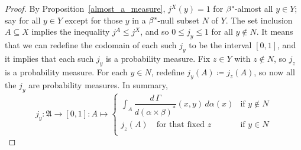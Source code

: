 \documentclass[
twoside=true,
paper=letter,
fontsize=9pt,
pagesize=auto,
leqno,
openany,
headsepline,
overfullrule,
]{scrbook}
\theoremstyle{plain}
\theoremstyle{plain}
\theoremstyle{definition}
\theoremstyle{bfnoteitalic}
\theoremstyle{bfnoteroman}
\newcommand{\sigalg}[1]{\mathfrak{#1}}
\newcommand{\definedby}{\coloneqq}
\newcommand{\sigmaalgebra}{\sigalg{A}}
\newcommand{\kernast}{\ast\kern-1pt}
\newcommand{\funcj}{j}
\newcommand{\measurespace}{X}
\newcommand{\measurespaceii}{Y}
\newcommand{\mspaceelt}{x}
\newcommand{\mspaceeltii}{y}
\newcommand{\mspaceeltiii}{z}
\newcommand{\seti}{A}
\newcommand{\measonprod}{\Gamma}%
\newcommand{\marginalone}{\alpha}%
\newcommand{\marginaltwo}{\beta}%
\begin{document}
\begin{proof}
By Proposition~\ref{almost_a_measure},
$j^\measurespace(\mspaceeltii) = 1$
for $\marginaltwo^\kernast$\hyp{}almost all  $\mspaceeltii\in\measurespaceii$; say for all
$\mspaceeltii\in\measurespaceii$ except for  those
$\mspaceeltii$ in a $\marginaltwo^\kernast$\hyp{}null subset $N$ of
$\measurespaceii$.
The set inclusion
$\seti\subseteq\measurespace$
implies the inequality
$\funcj^\seti \leq
\funcj^\measurespace$,
and so $0 \leq \funcj_\mspaceeltii \leq 1$ for all $\mspaceeltii \notin N$.
It means that we can redefine the codomain of each such $\funcj_\mspaceeltii$ to be the interval $[0,1]$, and it implies that each such $\funcj_\mspaceeltii$ is a probability measure.
Fix $\mspaceeltiii\in\measurespaceii$ with $\mspaceeltiii\notin N$, so $\funcj_\mspaceeltiii$ is a probability measure. For each
$\mspaceeltii \in N$,
redefine
$\funcj_\mspaceeltii(\seti)
\definedby
\funcj_\mspaceeltiii(\seti)$,
so now all the $\funcj_\mspaceeltii$ are probability measures.
In summary,
\[
\funcj_\mspaceeltii
:\sigmaalgebra \to [0,1]
:\seti \mapsto
\begin{cases}
\displaystyle \int_\seti
\dfrac{d\,\measonprod}{d(\marginalone\times\marginaltwo)^*}
(\mspaceelt,\mspaceeltii)\, d\marginalone(\mspaceelt)
& \text{if $\mspaceeltii\notin N$}
\\
\funcj_\mspaceeltiii(\seti) \quad\text{for that fixed $\mspaceeltiii$}
& \text{if $\mspaceeltii \in N$}
\\
\end{cases}
\]


\end{proof}
\end{document}

